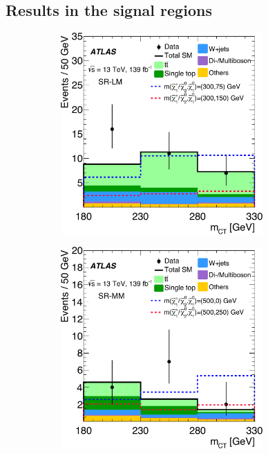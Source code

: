 \subsection{Results in the signal regions}




 \begin{figure}
	\centering
	\begin{subfigure}[b]{0.5\linewidth}
		\centering\includegraphics[width=0.85\textwidth]{OneLepton_Wh_SRLMEM_mct2_yellow}
	\end{subfigure}\hfill
	\begin{subfigure}[b]{0.5\linewidth}
		\centering\includegraphics[width=0.85\textwidth]{OneLepton_Wh_SRMMEM_mct2_yellow}

\end{subfigure}
\end{figure}
